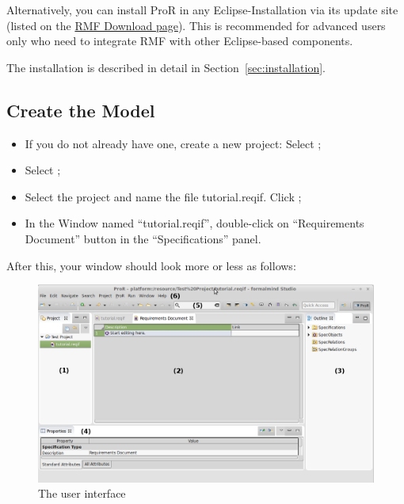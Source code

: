  Alternatively, you can install ProR in any Eclipse-Installation via its update site (listed on the \href{https://www.eclipse.org/rmf/download.php}{RMF Download page}).  This is recommended for advanced users only who need to integrate RMF with other Eclipse-based components.

\begin{info}
The installation is described in detail in Section~\ref{sec:installation}.
\end{info}

\subsection{Create the Model}

\begin{itemize}

\item
  If you do not already have one, create a new project: Select  ;
\item
  Select ;
\item
  Select the project and name the file tutorial.reqif.  Click ;
\item
  In the Window named ``tutorial.reqif'', double-click on ``Requirements
  Document'' button in the ``Specifications'' panel.
\end{itemize}

After this, your window should look more or less as follows:

\begin{figure}[H]
  \centering
  \includegraphics[width=\linewidth]{../rmf-images/Screenshot_intro.png}
  \caption{The \pror{} user interface}
\end{figure}

